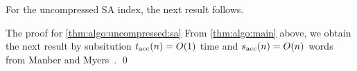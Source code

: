 For the uncompressed SA index, the next result follows. 

\begin{statement}{The proof for \cref{thm:algo:uncompressed:sa}}
  From \cref{thm:algo:main} above, we obtain the next result by subsitution $t_{\mathrm{acc}}(n) = O(1)$ time and $s_{\mathrm{acc}}(n) = O(n)$ words from Manber and Myers~\cite{manber:myers1993suffixarrays}.
  \qed 
\end{statement}




